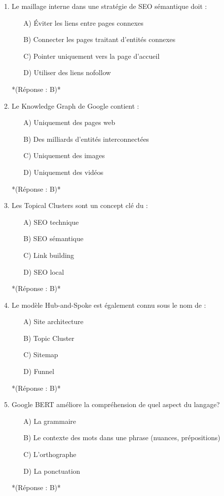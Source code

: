 \documentclass[12pt,a4paper,twoside]{report}
\begin{document}
\begin{enumerate}
\item Le maillage interne dans une stratégie de SEO sémantique doit :
\begin{itemize}
\item[A)] Éviter les liens entre pages connexes
\item[B)] Connecter les pages traitant d'entités connexes
\item[C)] Pointer uniquement vers la page d'accueil
\item[D)] Utiliser des liens nofollow
\end{itemize}
*(Réponse : B)*

\item Le Knowledge Graph de Google contient :
\begin{itemize}
\item[A)] Uniquement des pages web
\item[B)] Des milliards d'entités interconnectées
\item[C)] Uniquement des images
\item[D)] Uniquement des vidéos
\end{itemize}
*(Réponse : B)*

\item Les Topical Clusters sont un concept clé du :
\begin{itemize}
\item[A)] SEO technique
\item[B)] SEO sémantique
\item[C)] Link building
\item[D)] SEO local
\end{itemize}
*(Réponse : B)*

\item Le modèle Hub-and-Spoke est également connu sous le nom de :
\begin{itemize}
\item[A)] Site architecture
\item[B)] Topic Cluster
\item[C)] Sitemap
\item[D)] Funnel
\end{itemize}
*(Réponse : B)*

\item Google BERT améliore la compréhension de quel aspect du langage?
\begin{itemize}
\item[A)] La grammaire
\item[B)] Le contexte des mots dans une phrase (nuances, prépositions)
\item[C)] L'orthographe
\item[D)] La ponctuation
\end{itemize}
*(Réponse : B)*


\end{enumerate}
\end{document}
